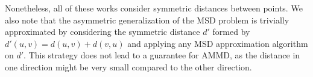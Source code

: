 Nonetheless, all of these works consider symmetric distances between points. We also note that the asymmetric generalization of the MSD problem is trivially approximated by considering the symmetric distance $d'$ formed by $d'(u,v) = d(u,v)+d(v,u)$ and applying any MSD approximation algorithm on $d'$. This strategy does not lead to a guarantee for AMMD, as the distance in one direction might be very small compared to the other direction.